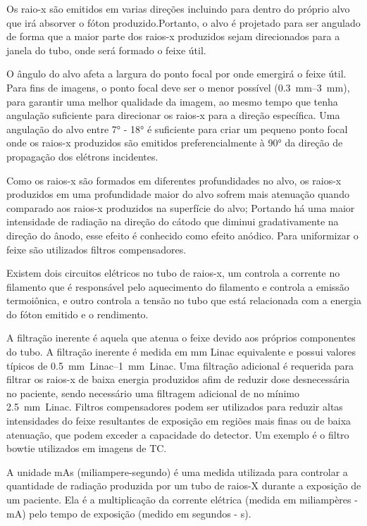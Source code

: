 \documentclass[11pt,a4paper]{article}
\newcounter{exemplo}
\begin{document}
    Os raio-x são emitidos em varias direções incluindo para dentro do próprio alvo que irá absorver o fóton produzido.Portanto,  o alvo é projetado para ser angulado de forma que a maior parte dos raios-x produzidos sejam direcionados para a janela do tubo, onde será formado o feixe útil. 

    O ângulo do alvo afeta a largura do ponto focal por onde emergirá o feixe útil. Para fins de imagens, o ponto focal deve ser o menor possível (\qtyrange{0.3}{3}{mm}), para garantir uma melhor qualidade da imagem, ao mesmo tempo que tenha angulação suficiente para direcionar os raios-x para a direção específica. Uma angulação do alvo entre \ang{7} - \ang{18} é suficiente para criar um pequeno ponto focal onde os raios-x produzidos são emitidos preferencialmente à \ang{90} da direção de propagação dos elétrons incidentes.

    Como os raios-x são formados em diferentes profundidades no alvo, os raios-x produzidos em uma profundidade maior do alvo sofrem mais atenuação quando comparado aos raios-x produzidos na superfície do alvo; Portando há uma maior intensidade de radiação na direção do cátodo que diminui gradativamente na direção do ânodo, esse efeito é conhecido como efeito anódico. Para uniformizar o feixe são utilizados filtros compensadores.


    Existem dois circuitos elétricos no tubo de raios-x, um controla a corrente no filamento que é responsável pelo aquecimento do filamento e controla a emissão termoiônica, e outro controla a tensão no tubo que está relacionada com a energia do fóton emitido e o rendimento.

    A filtração inerente é aquela que atenua o feixe devido aos próprios componentes do tubo. A filtração inerente é medida em mm Linac equivalente e possui valores típicos de \qtyrange{0.5}{1}{mm Linac}. Uma filtração adicional é requerida para filtrar os raios-x de baixa energia produzidos afim de reduzir dose desnecessária no paciente, sendo necessário uma filtragem adicional de no mínimo \qty{2.5}{mm Linac}. Filtros compensadores podem ser utilizados para reduzir altas intensidades do feixe resultantes de exposição em regiões mais finas ou de baixa atenuação, que podem exceder a capacidade do detector. Um exemplo é o filtro bowtie utilizados em imagens de TC.

    A unidade mAs (miliampere-segundo) é uma medida utilizada para controlar a quantidade de radiação produzida por um tubo de raios-X durante a exposição de um paciente. Ela é a multiplicação da corrente elétrica (medida em miliampères - mA) pelo tempo de exposição (medido em segundos - s).
\end{document}
